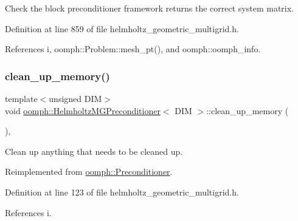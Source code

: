 Check the block preconditioner framework returns the correct system matrix. 

Definition at line 859 of file helmholtz\+\_\+geometric\+\_\+multigrid.\+h.



References i, oomph\+::\+Problem\+::mesh\+\_\+pt(), and oomph\+::oomph\+\_\+info.

\mbox{\label{classoomph_1_1HelmholtzMGPreconditioner_a8ffcf85fcfeac6c4d17c14c6ee35549b}} 
\subsubsection{\texorpdfstring{clean\+\_\+up\+\_\+memory()}{clean\_up\_memory()}}
{\footnotesize\ttfamily template$<$unsigned D\+IM$>$ \\
void \hyperlink{classoomph_1_1HelmholtzMGPreconditioner}{oomph\+::\+Helmholtz\+M\+G\+Preconditioner}$<$ D\+IM $>$\+::clean\+\_\+up\+\_\+memory (\begin{DoxyParamCaption}{ }\end{DoxyParamCaption})\hspace{0.3cm}{\ttfamily [inline]}, {\ttfamily [virtual]}}



Clean up anything that needs to be cleaned up. 



Reimplemented from \hyperlink{classoomph_1_1Preconditioner_a46c31c416829bedcd9db238431262027}{oomph\+::\+Preconditioner}.



Definition at line 123 of file helmholtz\+\_\+geometric\+\_\+multigrid.\+h.



References i.

\mbox{\label{classoomph_1_1HelmholtzMGPreconditioner_a1725e615a59cc6986efd313167295aa5}} 
